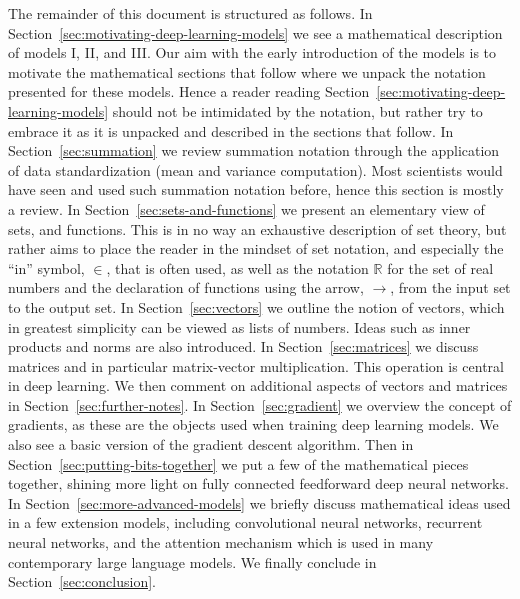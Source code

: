 \documentclass[12pt]{article}
\begin{document}
The remainder of this document is structured as follows. In Section~\ref{sec:motivating-deep-learning-models} we see a mathematical description of models I, II, and III. Our aim with the early introduction of the models is to motivate the mathematical sections that follow where we unpack the notation presented for these models. Hence a reader reading Section~\ref{sec:motivating-deep-learning-models} should not be intimidated by the notation, but rather try to embrace it as it is unpacked and described in the sections that follow. In Section~\ref{sec:summation} we review summation notation through the application of data standardization (mean and variance computation). Most scientists would have seen and used such summation notation before, hence this section is mostly a review.  In Section~\ref{sec:sets-and-functions} we present an elementary view of sets, and functions. This is in no way an exhaustive description of set theory, but rather aims to place the reader in the mindset of set notation, and especially the ``in'' symbol, $\in$, that is often used, as well as the notation ${\mathbb R}$ for the set of real numbers and the declaration of functions using the arrow, $\to$, from the input set to the output set. In Section~\ref{sec:vectors} we outline the notion of vectors, which in greatest simplicity can be viewed as lists of numbers. Ideas such as inner products and norms are also introduced. In Section~\ref{sec:matrices} we discuss matrices and in particular matrix-vector multiplication. This operation is central in deep learning. We then comment on additional aspects of vectors and matrices in Section~\ref{sec:further-notes}. In Section~\ref{sec:gradient} we overview the concept of gradients, as these are the objects used when training deep learning models. We also see a basic version of the gradient descent algorithm. Then in Section~\ref{sec:putting-bits-together} we put a few of the mathematical pieces together, shining more light on fully connected feedforward deep neural networks. In Section~\ref{sec:more-advanced-models} we briefly discuss mathematical ideas used in a few extension models, including convolutional neural networks, recurrent neural networks, and the attention mechanism which is used in many contemporary large language models. We finally conclude in Section~\ref{sec:conclusion}.

\end{document}
